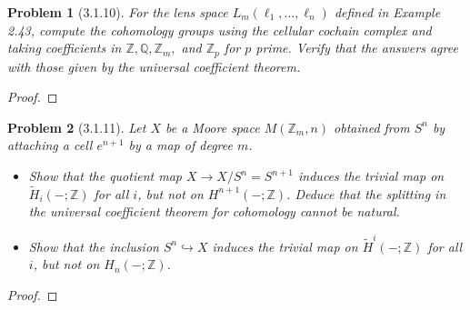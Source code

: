 \documentclass[10pt]{article}
\newcommand{\sk}{\vskip 10mm}
\newcommand{\bb}[1]{\mathbb{#1}}
\newcommand{\rH}{\widetilde{H}}
\theoremstyle{plain}
\newtheorem{problem}{Problem}
\theoremstyle{remark}
\begin{document}
\begin{problem}[3.1.10]
  For the lens space $L_m(\ell_1,\ldots,\ell_n)$ defined in Example 2.43,
  compute the cohomology groups using the cellular cochain complex
  and taking coefficients in $\bb{Z},\bb{Q},\bb{Z}_m,$ and $\bb{Z}_p$
  for $p$ prime. Verify that the answers agree with those given by the
  universal coefficient theorem.
\end{problem}

\begin{proof}
  
\end{proof}

\sk

\begin{problem}[3.1.11]
  Let $X$ be a Moore space $M(\bb{Z}_m,n)$ obtained from $S^n$ by attaching
  a cell $e^{n+1}$ by a map of degree $m$.
  \begin{itemize}
  \item[(a)] Show that the quotient map $X\rightarrow X/S^n=S^{n+1}$ induces the
    trivial map on $\rH_i(-;\bb{Z})$ for all $i$, but not on
    $H^{n+1}(-;\bb{Z})$. Deduce that the splitting in the universal coefficient
    theorem for cohomology cannot be natural.
  \item[(b)] Show that the inclusion $S^n\hookrightarrow X$ induces the trivial
    map on $\rH^i(-;\bb{Z})$ for all $i$, but not on $H_n(-;\bb{Z})$.
  \end{itemize}
\end{problem}

\begin{proof}
  
\end{proof}
\end{document}
